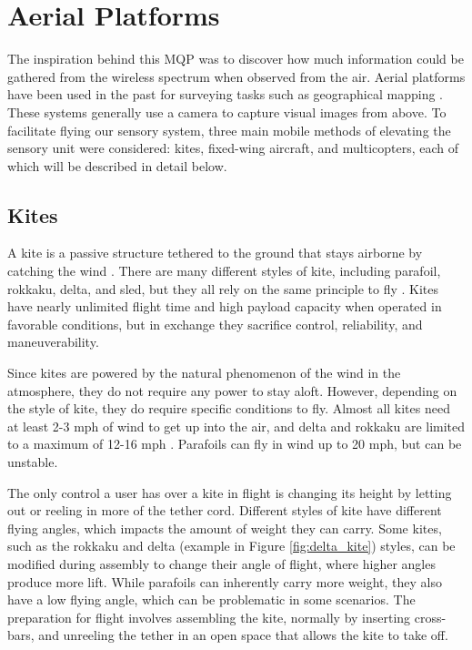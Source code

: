 \section{Aerial Platforms}
The inspiration behind this MQP was to discover how much information could be gathered from the wireless spectrum when observed from the air. Aerial platforms have been used in the past for surveying tasks such as geographical mapping \cite{geomap_patent}. These systems generally use a camera to capture visual images from above. To facilitate flying our sensory system, three main mobile methods of elevating the sensory unit were considered: kites, fixed-wing aircraft, and multicopters, each of which will be described in detail below.

\subsection{Kites}
A kite is a passive structure tethered to the ground that stays airborne by catching the wind \cite{kite_book}. There are many different styles of kite, including parafoil, rokkaku, delta, and sled, but they all rely on the same principle to fly \cite{kite_book} \cite{kite_iqp}. Kites have nearly unlimited flight time and high payload capacity when operated in favorable conditions, but in exchange they sacrifice control, reliability, and maneuverability.\par
Since kites are powered by the natural phenomenon of the wind in the atmosphere, they do not require any power to stay aloft. However, depending on the style of kite, they do require specific conditions to fly. Almost all kites need at least 2-3 mph of wind to get up into the air, and delta and rokkaku are limited to a maximum of 12-16 mph \cite{kite_iqp}. Parafoils can fly in wind up to 20 mph, but can be unstable.\par
The only control a user has over a kite in flight is changing its height by letting out or reeling in more of the tether cord. Different styles of kite have different flying angles, which impacts the amount of weight they can carry. Some kites, such as the rokkaku and delta (example in Figure \ref{fig:delta_kite}) styles, can be modified during assembly to change their angle of flight, where higher angles produce more lift. While parafoils can inherently carry more weight, they also have a low flying angle, which can be problematic in some scenarios. The preparation for flight involves assembling the kite, normally by inserting cross-bars, and unreeling the tether in an open space that allows the kite to take off.\par
